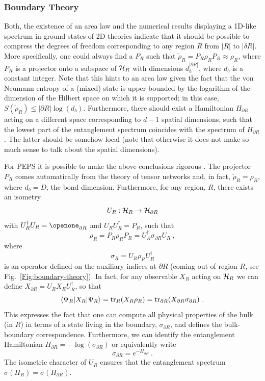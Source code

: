 \documentclass[rmp,aps,reprint,superscriptaddress,nobalancelastpage]{revtex4-1}
\def\Id{{\openone}}
\newcommand{\be}{\begin{equation}}
\newcommand{\ee}{\end{equation}}
\begin{document}
\subsubsection{Boundary Theory}\label{sec:boundary-theory}

Both, the existence of an area law and the numerical results displaying a 1D-like spectrum in ground states of 2D theories indicate that it should be possible to compress the degrees of freedom corresponding to any region $R$ from $|R|$ to $|\delta R|$. More specifically, one could always find a $P_R$ such that $\tilde\rho_R=P_R \rho_R P_R \approx \rho_R$, where $P_R$ is a projector onto a subspace of ${\cal H}_R$ with dimensions $d_b^{|\partial R|}$, where $d_b$ is a constant integer. Note that this hints to an area law given the fact that the von Neumann entropy of a (mixed) state is upper bounded by the logarithm of the dimension of the Hilbert space on which it is supported; in this case, $S(\tilde \rho_R)\le |\partial R| \log(d_b)$. Furthermore, there should exist a Hamiltonian $H_{\partial R}$ acting on a different space corresponding to $d-1$ spatial dimensions, such that the lowest part of the entanglement spectrum coincides with the spectrum of $H_{\partial R}$. The latter should be somehow local (note that otherwise it does not make so much sense to talk about the spatial dimensions).

For PEPS it is possible to make the above conclusions rigorous \cite{cirac:peps-boundaries}. The projector $P_R$ comes automatically from the theory of tensor networks and, in fact, $\tilde \rho_R=\rho_R$, where $d_b=D$, the bond dimension. Furthermore, for any region, $R$, there exists an isometry
\be
    U_R: {\cal H}_R \to {\cal H}_{\partial R}
\ee
with $U_R^\dagger U_R=\Id_{\partial R}$ and $U_RU_R^\dagger=P_R$, such that
\be
    \rho_R= P_R \rho_R P_R = U_R^\dagger \sigma_{\partial R} U_R\ ,
\ee
where
\be
    \label{sigmaR}
    \sigma_R= U_R \rho_R U_R^\dagger
\ee
is an operator defined on the auxiliary indices at $\partial R$ (coming out of region $R$, see Fig.~\ref{Fig:boundary-theory}). In fact, for any observable $X_R$ acting on ${\cal H}_R$ we can define $X_{\partial R}=U_R X_R U_R^\dagger$, so that
\be
    \langle \Psi_R| X_R|\Psi_R\rangle = {\rm tr}_R(X_R \rho_R)= {\rm tr}_{\partial R}(X_{\partial R} \sigma_{\partial R})\ .
\ee
This expresses the fact that one can compute all physical properties of the bulk (in $R$) in terms of a state living in the boundary, $\sigma_{\partial R}$, and defines the bulk-boundary correspondence. Furthermore, we can identify the entanglement Hamiltonian $H_{\partial R}=-\log(\sigma_{\partial R})$ or equivalently write
\be
    \sigma_{\partial R} = e^{-H_{\partial R}}\ .
\ee
The isometric character of $U_R$ ensures that the entanglement spectrum $\sigma(H_R)=\sigma(H_{\partial R})$.
\end{document}
